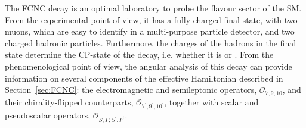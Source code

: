 The FCNC decay \BtoKstmumudecay is an optimal laboratory to probe the flavour sector of the SM.
From the experimental point of view, it has a fully charged final state, with two muons, which are easy to identify in a multi-purpose particle detector, and two charged hadronic particles.
Furthermore, the charges of the hadrons in the final state determine the CP-state of the decay, i.e. whether it is \BtoKstmumudecay or \BtoKstmumuconjdecay.
From the phenomenological point of view, the angular analysis of this decay can provide information on several components of the effective Hamiltonian described in Section~\ref{sec:FCNC}: the electromagnetic and semileptonic operators, $\mathcal{O}_{7,9,10}$, and their chirality-flipped counterparts, $\mathcal{O}_{7^\prime,9^\prime,10^\prime}$, together with scalar and pseudoscalar operators, $\mathcal{O}_{S,P,S^\prime,P^\prime}$.


